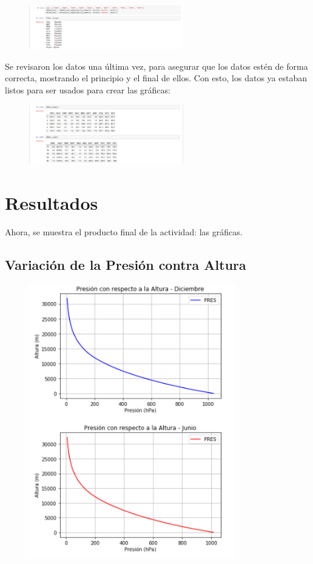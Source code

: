 \documentclass[a4paper]{article}
\begin{document}
 \bigskip
 \begin{figure}[h!]
 \centering
  \includegraphics[width=0.6\textwidth]{LecDat2.PNG}
 \end{figure}
 \bigskip
 Se revisaron los datos una última vez, para asegurar que los datos estén de forma correcta, mostrando el principio y el final de ellos. Con esto, los datos ya estaban listos para ser usados para crear las gráficas:
\bigskip
 \begin{figure}[h!]
 \centering
  \includegraphics[width=0.6\textwidth]{LecDat3.PNG}
 \end{figure}
\bigskip

\pagebreak
\section{Resultados}
Ahora, se muestra el producto final de la actividad: las gráficas. 

\subsection{Variación de la Presión contra Altura}
\bigskip
 \begin{figure}[h!]
 \centering
  \includegraphics[width=0.8\textwidth]{Grafica1.PNG}
 \end{figure}
\bigskip
\end{document}
